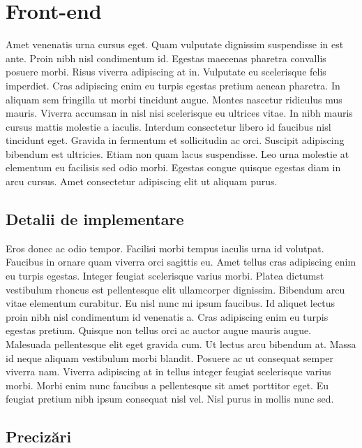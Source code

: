 \chapter{Front-end}

Amet venenatis urna cursus eget. Quam vulputate dignissim suspendisse in est ante. Proin nibh nisl condimentum id. Egestas maecenas pharetra convallis posuere morbi. Risus viverra adipiscing at in. Vulputate eu scelerisque felis imperdiet. Cras adipiscing enim eu turpis egestas pretium aenean pharetra. In aliquam sem fringilla ut morbi tincidunt augue. Montes nascetur ridiculus mus mauris. Viverra accumsan in nisl nisi scelerisque eu ultrices vitae. In nibh mauris cursus mattis molestie a iaculis. Interdum consectetur libero id faucibus nisl tincidunt eget. Gravida in fermentum et sollicitudin ac orci. Suscipit adipiscing bibendum est ultricies. Etiam non quam lacus suspendisse. Leo urna molestie at elementum eu facilisis sed odio morbi. Egestas congue quisque egestas diam in arcu cursus. Amet consectetur adipiscing elit ut aliquam purus.

\section{Detalii de implementare}

Eros donec ac odio tempor. Facilisi morbi tempus iaculis urna id volutpat. Faucibus in ornare quam viverra orci sagittis eu. Amet tellus cras adipiscing enim eu turpis egestas. Integer feugiat scelerisque varius morbi. Platea dictumst vestibulum rhoncus est pellentesque elit ullamcorper dignissim. Bibendum arcu vitae elementum curabitur. Eu nisl nunc mi ipsum faucibus. Id aliquet lectus proin nibh nisl condimentum id venenatis a. Cras adipiscing enim eu turpis egestas pretium. Quisque non tellus orci ac auctor augue mauris augue. Malesuada pellentesque elit eget gravida cum. Ut lectus arcu bibendum at. Massa id neque aliquam vestibulum morbi blandit. Posuere ac ut consequat semper viverra nam. Viverra adipiscing at in tellus integer feugiat scelerisque varius morbi. Morbi enim nunc faucibus a pellentesque sit amet porttitor eget. Eu feugiat pretium nibh ipsum consequat nisl vel. Nisl purus in mollis nunc sed.

\section{Precizări}

